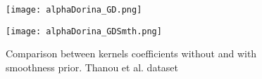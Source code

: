 \begin{figure}
  \centering
  \begin{minipage}[c]{.8\textwidth}
    \centering
    \texttt{[image: alphaDorina\_GD.png]}
  \end{minipage}
  \begin{minipage}[c]{.8\textwidth}
    \centering
    \texttt{[image: alphaDorina\_GDSmth.png]}
  \end{minipage}
  \caption{Comparison between kernels coefficients without and with smoothness prior. Thanou et al.   dataset}
  \label{fig:alphaGDDorina}
\end{figure}
